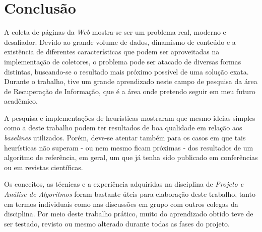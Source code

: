 \documentclass[a4paper,12pt,titlepage]{article}
\begin{document}
\section{Conclusão}

A coleta de páginas da \textit{Web} mostra-se ser um problema real, moderno e desafiador. Devido ao grande volume de dados, dinamismo de conteúdo e a existência de diferentes características que podem ser aproveitadas na implementação de coletores, o problema pode ser atacado de diversas formas distintas, buscando-se o resultado mais próximo possível de uma solução exata. Durante o trabalho, tive um grande aprendizado neste campo de pesquisa da área de Recuperação de Informação, que é a área onde pretendo seguir em meu futuro acadêmico.

A pesquisa e implementações de heurísticas mostraram que mesmo ideias simples como a deste trabalho podem ter resultados de boa qualidade em relação aos \textit{baselines} utilizados. Porém, deve-se atentar também para os casos em que tais heurísticas não superam - ou nem mesmo ficam próximas - dos resultados de um algoritmo de referência, em geral, um que já tenha sido publicado em conferências ou em revistas científicas.

Os conceitos, as técnicas e a experiência adquiridas na disciplina de \textit{Projeto e Análise de Algoritmos} foram bastante úteis para elaboração deste trabalho, tanto em termos individuais como nas discussões em grupo com outros colegas da disciplina. Por meio deste trabalho prático, muito do aprendizado obtido teve de ser testado, revisto ou mesmo alterado durante todas as fases do projeto.


\newpage
\end{document}
